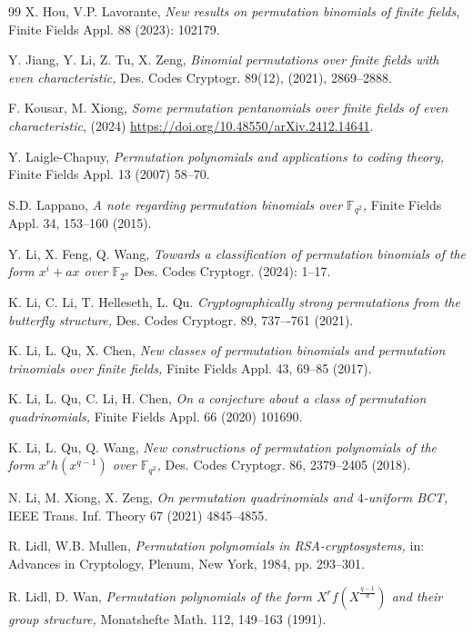 \documentclass[12pt]{amsart}
\numberwithin{equation}{section}
\theoremstyle{definition}
\newcommand{\F}{\mathbb F}
\begin{document}
\begin{thebibliography}{99}
 X. Hou, V.P. Lavorante, {\it New results on permutation binomials of finite fields}, Finite Fields Appl. 88 (2023): 102179.

 Y. Jiang, Y. Li, Z. Tu, X. Zeng, {\it Binomial permutations over finite fields with even characteristic,} Des. Codes Cryptogr. 89(12), (2021), 2869--2888.

 F. Kousar, M. Xiong, {\it Some permutation pentanomials over finite fields of even characteristic}, (2024) \url{https://doi.org/10.48550/arXiv.2412.14641}.

 Y. Laigle-Chapuy, {\it Permutation polynomials and applications to coding theory,} Finite Fields Appl. 13 (2007) 58--70.

 S.D. Lappano, {\it A note regarding permutation binomials over $\F_{q^2}$,} Finite Fields Appl. 34, 153--160 (2015).

 Y. Li, X. Feng, Q. Wang, {\it Towards a classification of permutation binomials of the form $x^i+ ax$ over $\F_{2^n}$} Des. Codes Cryptogr. (2024): 1--17.

 K. Li, C. Li, T. Helleseth, L. Qu. {\it Cryptographically strong permutations from the butterfly structure,} Des. Codes Cryptogr. 89, 737–-761 (2021).

 K. Li, L. Qu, X. Chen, {\it New classes of permutation binomials and permutation trinomials over finite fields,} Finite Fields Appl. 43, 69--85 (2017).

 K. Li, L. Qu, C. Li, H. Chen, {\it On a conjecture about a class of permutation quadrinomials,} Finite Fields Appl. 66 (2020) 101690.

 K. Li, L. Qu, Q. Wang, {\it New constructions of permutation polynomials of the form $x^{r}h\left(x^{q-1}\right) $ over $\F_{q^2}$,} Des. Codes Cryptogr. 86, 2379--2405 (2018).

  N. Li, M. Xiong, X. Zeng, {\it On permutation quadrinomials and $4$-uniform BCT,} IEEE Trans. Inf. Theory 67 (2021) 4845--4855.

  R. Lidl, W.B. Mullen, {\it Permutation polynomials in RSA-cryptosystems,} in: Advances in Cryptology, Plenum, New York, 1984, pp. 293--301.

  R. Lidl, D. Wan, {\it Permutation polynomials of the form $X^r f (X^\frac{q-1}{d})$ and their group structure,} Monatshefte Math. 112, 149--163 (1991).


\end{thebibliography}
\end{document}
